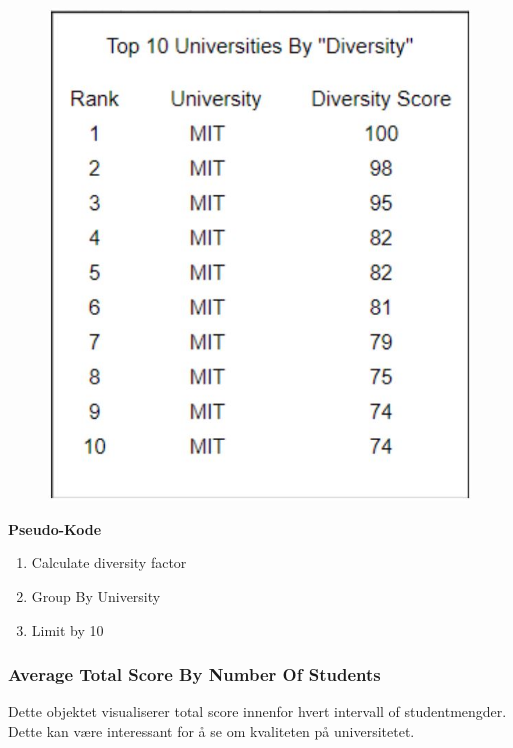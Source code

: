 \FigureCounter
\begin{figure}[H]
  \includegraphics[scale=1]{images/milepael4/topTenUnis.JPG}
\end{figure}

\textbf{Pseudo-Kode}
\begin{enumerate}
  \item Calculate diversity factor
  \item Group By University
  \item Limit by 10
\end{enumerate}

\subsubsection{Average Total Score By Number Of Students}
Dette objektet visualiserer total score innenfor hvert intervall of studentmengder. Dette kan være 
interessant for å se om kvaliteten på universitetet.

